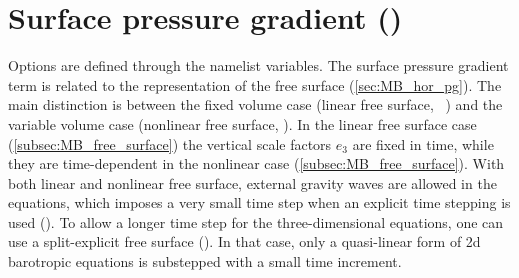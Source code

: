 \documentclass[../main/NEMO_manual]{subfiles}
\begin{document}
\section[Surface pressure gradient (\textit{dynspg.F90})]{Surface pressure gradient (\protect{})}
\label{sec:DYN_spg}

\begin{listing}
  \caption{}
  \label{lst:namdyn_spg}
\end{listing}

Options are defined through the  namelist variables.
The surface pressure gradient term is related to the representation of the free surface (\autoref{sec:MB_hor_pg}).
The main distinction is between the fixed volume case (linear free surface, \ie\ ) and
the variable volume case (nonlinear free surface, ).
In the linear free surface case (\autoref{subsec:MB_free_surface})
the vertical scale factors $e_{3}$ are fixed in time,
while they are time-dependent in the nonlinear case (\autoref{subsec:MB_free_surface}).
With both linear and nonlinear free surface, external gravity waves are allowed in the equations,
which imposes a very small time step when an explicit time stepping is used ().
To allow a longer time step for the three-dimensional equations, one can use a split-explicit free surface 
(). In that case, only a quasi-linear
 form of 2d barotropic equations is substepped with a small time increment.
\end{document}
